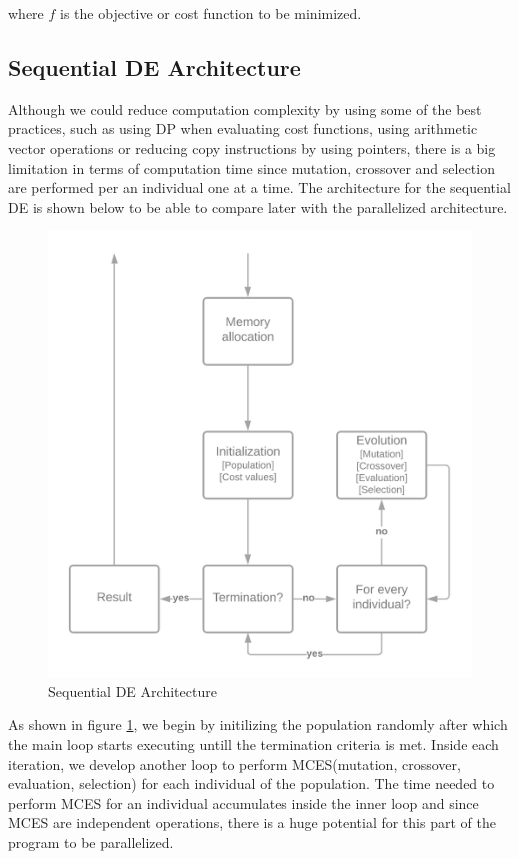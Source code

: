 \documentclass[conference]{IEEEtran}
\begin{document}
where $f$ is the objective or cost function to be minimized.

\subsection{Sequential DE Architecture}
Although we could reduce computation complexity by using some of the best practices, such as using DP when evaluating cost functions, using arithmetic vector operations or reducing copy instructions by 
using pointers, there is a big limitation in terms of computation time since mutation, crossover and selection are performed per an individual one at a time. The architecture for the sequential 
DE is shown below to be able to compare later with the parallelized architecture.

\begin{figure}[h]
	\centering
	\includegraphics[width=0.75\linewidth]{img/seq_arch.png}
	\caption{Sequential DE Architecture}
	\label{fig:seq_arch}
\end{figure}

As shown in figure \ref{fig:seq_arch}, we begin by initilizing the population randomly after which the main loop starts executing untill the termination criteria is met. Inside each iteration, 
we develop another loop to perform MCES(mutation, crossover, evaluation, selection) for each individual of the population. The time needed to perform MCES for an individual accumulates inside 
the inner loop and since MCES are independent operations, there is a huge potential for this part of the program to be parallelized.
\end{document}
